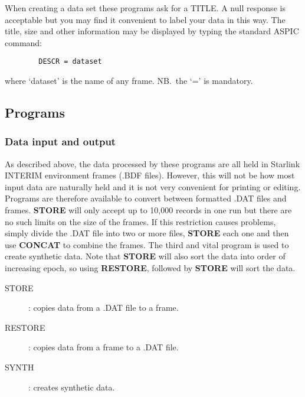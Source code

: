 When creating a data set these programs ask for a TITLE.
A null response is acceptable but you may find it convenient to label your data
in this way.
The title, size and other information may be displayed by typing the standard
ASPIC command:
\begin{verbatim}
        DESCR = dataset
\end{verbatim}
where `dataset' is the name of any frame.
NB.\ the `=' is mandatory.
\subsection {Programs}
\subsubsection {Data input and output}
As described above, the data processed by these programs are all held in
Starlink INTERIM environment frames (.BDF files).
However, this will not be how most input data are naturally held and it is not
very convenient for printing or editing.
Programs are therefore available to convert between formatted .DAT files and
frames.
{\bf STORE} will only accept up to 10,000 records in one run but there are no
such limits on the size of the frames.
If this restriction causes problems, simply divide the .DAT file into two or
more files, {\bf STORE} each one and then use {\bf CONCAT} to combine the
frames.
The third and vital program is used to create synthetic data.
Note that {\bf STORE} will also sort the data into order of increasing epoch, so
using {\bf RESTORE}, followed by {\bf STORE} will sort the data.
\begin{description}
\item [STORE]: copies data from a .DAT file to a frame.
\item [RESTORE]: copies data from a frame to a .DAT file.
\item [SYNTH]: creates synthetic data.
\end{description}
